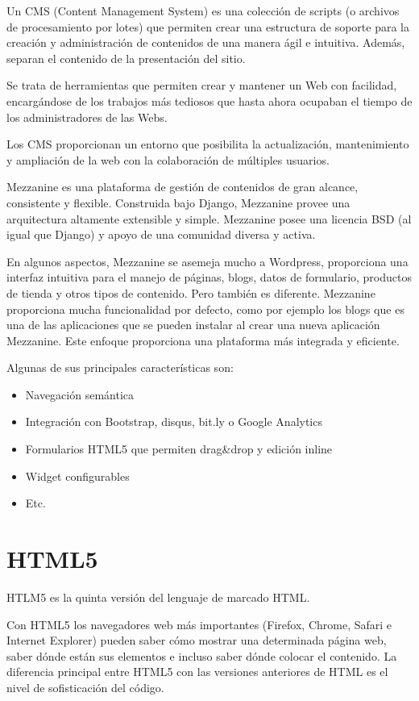 Un CMS (Content Management System) es una colección de scripts (o archivos de procesamiento por lotes) que permiten crear una estructura de soporte para la creación y administración de contenidos de una manera ágil e intuitiva. Además, separan el contenido de la presentación del sitio.


Se trata de herramientas que permiten crear y mantener un Web con facilidad, encargándose de los trabajos más tediosos que hasta ahora ocupaban el tiempo de los administradores de las Webs. 


Los CMS proporcionan un entorno que posibilita la actualización, mantenimiento y ampliación de la web con la colaboración de múltiples usuarios.


Mezzanine es una plataforma de gestión de contenidos de gran alcance, consistente y flexible. Construida bajo Django, Mezzanine provee una arquitectura altamente extensible y simple. Mezzanine posee una licencia BSD (al igual que Django) y apoyo de una comunidad diversa y activa.


En algunos aspectos, Mezzanine se asemeja mucho a Wordpress, proporciona una interfaz intuitiva para el manejo de páginas, blogs, datos de formulario, productos de tienda y otros tipos de contenido. Pero también es diferente. Mezzanine proporciona mucha funcionalidad por defecto, como por ejemplo los blogs que es una de las aplicaciones que se pueden instalar al crear una nueva aplicación Mezzanine. Este enfoque proporciona una plataforma más integrada y eficiente.


Algunas de sus principales características son:


\begin{itemize}
\item Navegación semántica
\item Integración con Bootstrap, disqus, bit.ly o Google Analytics 
\item Formularios HTML5 que permiten drag\&drop y edición inline
\item Widget configurables
\item Etc.
\end{itemize}


\section{HTML5} 
\label{sec:html5}


HTLM5 es la quinta versión del lenguaje de marcado HTML.


Con HTML5 los navegadores web más importantes (Firefox, Chrome, Safari e Internet Explorer) pueden saber cómo mostrar una determinada página web, saber dónde están sus elementos e incluso saber dónde colocar el contenido. La diferencia principal entre HTML5 con las versiones anteriores de HTML es el nivel de sofisticación del código.


